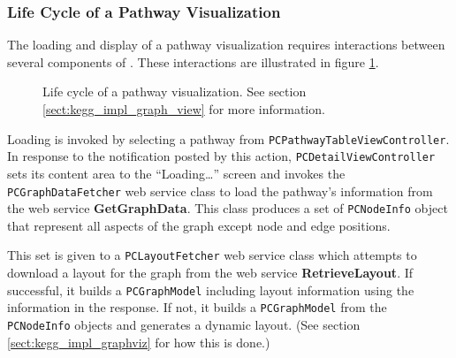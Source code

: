 \subsubsection{Life Cycle of a Pathway Visualization}

The loading and display of a pathway visualization requires interactions between
several components of \keggapp. These interactions are illustrated in figure
\ref{fig:kegg_viz_life_cycle}.

\begin{figure}[htbp]
    \caption{\label{fig:kegg_viz_life_cycle} Life cycle of a pathway
    visualization. See section \ref{sect:kegg_impl_graph_view} for more
    information.}
\end{figure}

Loading is invoked by selecting a pathway from
\texttt{PCPathwayTableViewController}. In response to the notification posted by
this action, \texttt{PCDetailViewController} sets its content area to the
``Loading\ldots'' screen and invokes the \texttt{PCGraphDataFetcher} web service
class to load the pathway's information from the \pathcasekegg web service
\textbf{GetGraphData}. This class produces a set of \texttt{PCNodeInfo} object
that represent all aspects of the graph except node and edge positions.

This set is given to a \texttt{PCLayoutFetcher} web service class which attempts
to download a layout for the graph from the \pathcasekegg web service
\textbf{RetrieveLayout}. If successful, it builds a \texttt{PCGraphModel}
including layout information using the information in the response. If not, it
builds a \texttt{PCGraphModel} from the \texttt{PCNodeInfo} objects and
generates a dynamic layout. (See section \ref{sect:kegg_impl_graphviz} for how
this is done.)

